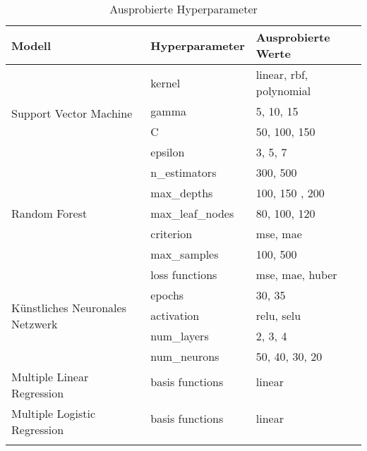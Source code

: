 \begin{table}[ht]
  \caption{\label{tab:hyperparameter} Ausprobierte Hyperparameter}
  \begin{tabular}{ p{4cm}  p{4cm}  p{5cm} }
    \toprule
    Modell                                               & Hyperparameter   & Ausprobierte Werte      \\
    \midrule
    \multirow{4}{7em}{Support Vector Machine}            & kernel           & linear, rbf, polynomial \\
                                                         & gamma            & 5, 10, 15               \\
                                                         & C                & 50, 100, 150            \\
                                                         & epsilon          & 3, 5, 7                 \\
    \midrule
    \multirow{5}{7em}{Random Forest}                     & n\_estimators    & 300, 500                \\
                                                         & max\_depths      & 100, 150 , 200          \\
                                                         & max\_leaf\_nodes & 80, 100, 120            \\
                                                         & criterion        & mse, mae                \\
                                                         & max\_samples     & 100, 500                \\
    \midrule
    \multirow{5}{7em}{K\"unstliches Neuronales Netzwerk} & loss functions   & mse, mae, huber         \\
                                                         & epochs           & 30, 35                  \\
                                                         & activation       & relu, selu              \\
                                                         & num\_layers      & 2, 3, 4                 \\
                                                         & num\_neurons     & 50, 40, 30, 20          \\
    \midrule
    \multirow{2}{7em}{Multiple Linear Regression}        & basis functions  & linear                  \\
                                                         &                  &                         \\
    \midrule
    \multirow{2}{7em}{Multiple Logistic Regression}      & basis functions  & linear                  \\
                                                         &                  &                         \\
                                                         &                  &                         \\
    \bottomrule
  \end{tabular}

\end{table}

